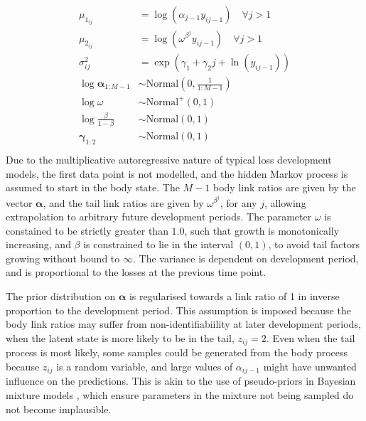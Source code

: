 \begin{align}
\begin{split}
    \mu_{1_{ij}} &= \log(\alpha_{j - 1} y_{ij-1}) \quad \forall j > 1\\
    \mu_{2_{ij}} &= \log(\omega^{\beta^{j}} y_{ij - 1}) \quad \forall j > 1\\
	\sigma_{ij}^2 &= \exp(\gamma_{1} + \gamma_{2} j + \ln(y_{ij-1}))\\
    \log \bm{\alpha}_{1:M - 1} &\sim \mathrm{Normal}(0, \scriptstyle{\frac{1}{1:M - 1}})\\
    \log \omega &\sim \mathrm{Normal}^{+}(0, 1)\\
    \log \frac{\beta}{1 - \beta} &\sim \mathrm{Normal}(0, 1)\\
    \bm{\gamma}_{1:2} &\sim \mathrm{Normal}(0, 1)\\
\end{split}
\end{align}
%
Due to the multiplicative autoregressive nature of typical
loss development models, the first data point is not modelled,
and the hidden Markov process is assumed to start in the
body state.
The $M - 1$ body link ratios are given by the vector $\bm{\alpha}$,
and the tail link ratios are given by $\omega^{\beta^{j}}$, for any $j$,
allowing extrapolation to arbitrary future development periods.
The parameter $\omega$ is constained to be strictly greater than $1.0$,
such that growth is monotonically increasing,
and $\beta$ is constrained to lie in the interval $(0, 1)$, to avoid
tail factors growing without bound to $\infty$.
The variance is dependent on development period,
and is proportional
to the losses at the previous time point.

The prior distribution on $\bm{\alpha}$ is regularised towards
a link ratio of 1 in inverse proportion to the development period.
This assumption is imposed because the body link ratios may suffer
from non-identifiabiility at later development periods, when the
latent state is more likely to be in the tail,
$z_{ij} = 2$.
Even when the tail process
is most likely,
some samples could be generated from the body process because
$z_{ij}$ is a random variable, and large values of $\alpha_{ij-1}$
might have unwanted influence on the predictions.
This is akin to the use of pseudo-priors in Bayesian mixture
models \citep{carlinchib1995}, which ensure parameters in the mixture
not being sampled do not become implausible.

